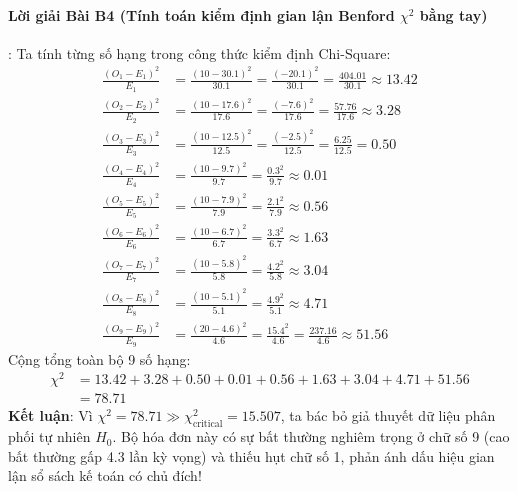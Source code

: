 \paragraph{Lời giải Bài B4 (Tính toán kiểm định gian lận Benford $\chi^2$ bằng tay)}:
Ta tính từng số hạng trong công thức kiểm định Chi-Square:
\begin{align*}
\frac{(O_1 - E_1)^2}{E_1} &= \frac{(10 - 30.1)^2}{30.1} = \frac{(-20.1)^2}{30.1} = \frac{404.01}{30.1} \approx 13.42 \\
\frac{(O_2 - E_2)^2}{E_2} &= \frac{(10 - 17.6)^2}{17.6} = \frac{(-7.6)^2}{17.6} = \frac{57.76}{17.6} \approx 3.28 \\
\frac{(O_3 - E_3)^2}{E_3} &= \frac{(10 - 12.5)^2}{12.5} = \frac{(-2.5)^2}{12.5} = \frac{6.25}{12.5} = 0.50 \\
\frac{(O_4 - E_4)^2}{E_4} &= \frac{(10 - 9.7)^2}{9.7} = \frac{0.3^2}{9.7} \approx 0.01 \\
\frac{(O_5 - E_5)^2}{E_5} &= \frac{(10 - 7.9)^2}{7.9} = \frac{2.1^2}{7.9} \approx 0.56 \\
\frac{(O_6 - E_6)^2}{E_6} &= \frac{(10 - 6.7)^2}{6.7} = \frac{3.3^2}{6.7} \approx 1.63 \\
\frac{(O_7 - E_7)^2}{E_7} &= \frac{(10 - 5.8)^2}{5.8} = \frac{4.2^2}{5.8} \approx 3.04 \\
\frac{(O_8 - E_8)^2}{E_8} &= \frac{(10 - 5.1)^2}{5.1} = \frac{4.9^2}{5.1} \approx 4.71 \\
\frac{(O_9 - E_9)^2}{E_9} &= \frac{(20 - 4.6)^2}{4.6} = \frac{15.4^2}{4.6} = \frac{237.16}{4.6} \approx 51.56
\end{align*}
Cộng tổng toàn bộ 9 số hạng:
\begin{align*}
\chi^2 &= 13.42 + 3.28 + 0.50 + 0.01 + 0.56 + 1.63 + 3.04 + 4.71 + 51.56 \\
&= \mathbf{78.71}
\end{align*}
\textbf{Kết luận}:
Vì $\chi^2 = 78.71 \gg \chi^2_{\text{critical}} = 15.507$, ta bác bỏ giả thuyết dữ liệu phân phối tự nhiên $H_0$. Bộ hóa đơn này có sự bất thường nghiêm trọng ở chữ số 9 (cao bất thường gấp 4.3 lần kỳ vọng) và thiếu hụt chữ số 1, phản ánh dấu hiệu gian lận sổ sách kế toán có chủ đích!

